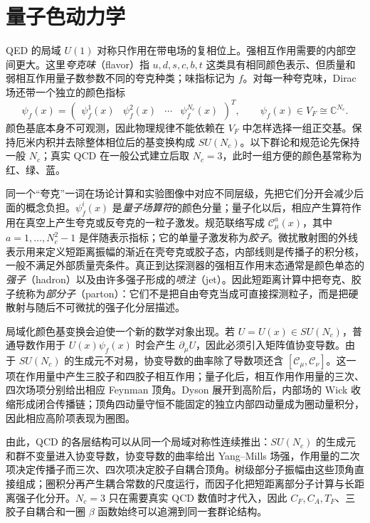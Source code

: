 \chapter{量子色动力学}\label{chap:qcd}

QED 的局域 $U(1)$ 对称只作用在带电场的复相位上。强相互作用需要的内部空间更大。这里\emph{夸克味}（flavor）指 $u,d,s,c,b,t$ 这类具有相同颜色表示、但质量和弱相互作用量子数参数不同的夸克种类；味指标记为 $f$。对每一种夸克味，Dirac 场还带一个独立的颜色指标
\begin{equation*}
 \psi_f(x)
 =\begin{pmatrix}
 \psi_f^1(x)&\psi_f^2(x)&\cdots&\psi_f^{N_c}(x)
 \end{pmatrix}^{\!T},
 \qquad \psi_f(x)\in V_F\cong\mathbb C^{N_c}.
\end{equation*}
颜色基底本身不可观测，因此物理规律不能依赖在 $V_F$ 中怎样选择一组正交基。保持厄米内积并去除整体相位后的基变换构成 $SU(N_c)$。以下群论和规范论先保持一般 $N_c$；真实 QCD 在一般公式建立后取 $N_c=3$，此时一组方便的颜色基常称为红、绿、蓝。

同一个“夸克”一词在场论计算和实验图像中对应不同层级，先把它们分开会减少后面的概念负担。$\psi_f^i(x)$ 是\emph{量子场算符}的颜色分量；量子化以后，相应产生算符作用在真空上产生夸克或反夸克的一粒子激发。规范联络写成 $\mathscr C_\mu^a(x)$，其中 $a=1,\ldots,N_c^2-1$ 是伴随表示指标；它的单量子激发称为\emph{胶子}。微扰散射图的外线表示用来定义短距离振幅的渐近在壳夸克或胶子态，内部线则是传播子的积分核，一般不满足外部质量壳条件。真正到达探测器的强相互作用末态通常是颜色单态的\emph{强子}（hadron）以及由许多强子形成的\emph{喷注}（jet）。因此短距离计算中把夸克、胶子统称为\emph{部分子}（parton）：它们不是把自由夸克当成可直接探测粒子，而是把硬散射与随后不可微扰的强子化分层描述。

局域化颜色基变换会迫使一个新的数学对象出现。若 $U=U(x)\in SU(N_c)$，普通导数作用于 $U(x)\psi_f(x)$ 时会产生 $\partial_\mu U$，因此必须引入矩阵值协变导数。由于 $SU(N_c)$ 的生成元不对易，协变导数的曲率除了导数项还含 $[\mathscr C_\mu,\mathscr C_\nu]$。这一项在作用量中产生三胶子和四胶子相互作用；量子化后，相互作用作用量的三次、四次场项分别给出相应 Feynman 顶角。Dyson 展开到高阶后，内部场的 Wick 收缩形成闭合传播链；顶角四动量守恒不能固定的独立内部四动量成为圈动量积分，因此相应高阶项表现为圈图。

由此，QCD 的各层结构可以从同一个局域对称性连续推出：$SU(N_c)$ 的生成元和群不变量进入协变导数，协变导数的曲率给出 Yang--Mills 场强，作用量的二次项决定传播子而三次、四次项决定胶子自耦合顶角。树级部分子振幅由这些顶角直接组成；圈积分再产生耦合常数的尺度运行，而因子化把短距离部分子计算与长距离强子化分开。$N_c=3$ 只在需要真实 QCD 数值时才代入，因此 $C_F,C_A,T_F$、三胶子自耦合和一圈 $\beta$ 函数始终可以追溯到同一套群论结构。








